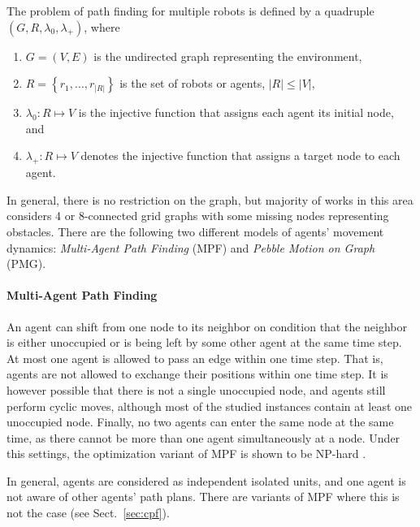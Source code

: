 The problem of path finding for multiple robots is defined by a quadruple $(G,R,\lambda_0,\lambda_+)$, where
\begin{enumerate}
	\item $G=(V,E)$ is the undirected graph representing the environment,
	\item $R=\left\{r_1,\dots,r_{|R|}\right\}$ is the set of robots or agents, $|R|\leq|V|$,
	\item $\lambda_0:R\mapsto V$ is the injective function that assigns each agent its initial node, and
	\item $\lambda_+:R\mapsto V$ denotes the injective function that assigns a target node to each agent.
\end{enumerate}
In general, there is no restriction on the graph, but majority of works in this area considers 4 or 8-connected grid graphs with some missing nodes representing obstacles.
There are the following two different models of agents' movement dynamics: \emph{Multi-Agent Path Finding} (MPF) and \emph{Pebble Motion on Graph} (PMG).

\paragraph{Multi-Agent Path Finding}
An agent can shift from one node to its neighbor on condition that the neighbor is either unoccupied or is being left by some other agent at the same time step. 
At most one agent is allowed to pass an edge within one time step. 
That is, agents are not allowed to exchange their positions within one time step.
It is however possible that there is not a single unoccupied node, and agents still perform cyclic moves, although most of the studied instances contain at least one unoccupied node.
Finally, no two agents can enter the same node at the same time, as there cannot be more than one agent simultaneously at a node.
Under this settings, the optimization variant of MPF is shown to be NP-hard \cite{surynek10}.

In general, agents are considered as independent isolated units, and one agent is not aware of other agents' path plans.
There are variants of MPF where this is not the case (see Sect.~\ref{sec:cpf}).

